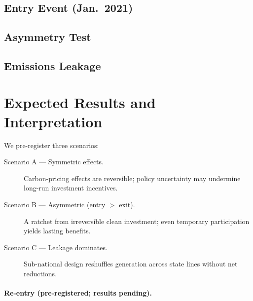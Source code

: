 \documentclass[12pt]{article}
\begin{document}
\subsection{Entry Event (Jan.\ 2021)}\label{sec:res-entry}
% 

\subsection{Asymmetry Test}\label{sec:res-asymmetry}

\subsection{Emissions Leakage}\label{sec:res-leakage}

\section{Expected Results and Interpretation}\label{sec:interpretation}
 We pre-register three scenarios:
\begin{description}
  \item[Scenario A --- Symmetric effects.] Carbon-pricing effects are reversible; policy
    uncertainty may undermine long-run investment incentives.
  \item[Scenario B --- Asymmetric (entry $>$ exit).] A ratchet from irreversible clean
    investment; even temporary participation yields lasting benefits.
  \item[Scenario C --- Leakage dominates.] Sub-national design reshuffles generation across
    state lines without net reductions.
\end{description}

\paragraph{Re-entry (pre-registered; results pending).} 
\end{document}
